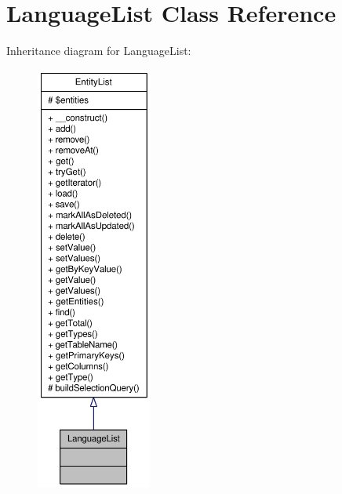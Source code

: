 \hypertarget{classLanguageList}{
\section{LanguageList Class Reference}
\label{classLanguageList}
}


Inheritance diagram for LanguageList:\nopagebreak
\begin{figure}[H]
\begin{center}
\leavevmode
\includegraphics[height=400pt]{classLanguageList__inherit__graph}
\end{center}
\end{figure}


